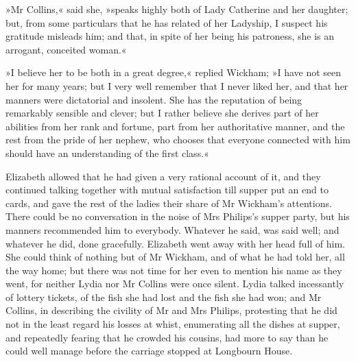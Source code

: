 »Mr Collins,« said she, »speaks highly both of Lady Catherine and her daughter; but, from some particulars that he has related of her Ladyship, I suspect his gratitude misleads him; and that, in spite of her being his patroness, she is an arrogant, conceited woman.«

»I believe her to be both in a great degree,« replied Wickham; »I have not seen her for many years; but I very well remember that I never liked her, and that her manners were dictatorial and insolent. She has the reputation of being remarkably sensible and clever; but I rather believe she derives part of her abilities from her rank and fortune, part from her authoritative manner, and the rest from the pride of her nephew, who chooses that everyone connected with him should have an understanding of the first class.«

Elizabeth allowed that he had given a very rational account of it, and they continued talking together with mutual satisfaction till supper put an end to cards, and gave the rest of the ladies their share of Mr Wickham's attentions. There could be no conversation in the noise of Mrs Philips's supper party, but his manners recommended him to everybody. Whatever he said, was said well; and whatever he did, done gracefully. Elizabeth went away with her head full of him. She could think of nothing but of Mr Wickham, and of what he had told her, all the way home; but there was not time for her even to mention his name as they went, for neither Lydia nor Mr Collins were once silent. Lydia talked incessantly of lottery tickets, of the fish she had lost and the fish she had won; and Mr Collins, in describing the civility of Mr and Mrs Philips, protesting that he did not in the least regard his losses at whist, enumerating all the dishes at supper, and repeatedly fearing that he crowded his cousins, had more to say than he could well manage before the carriage stopped at Longbourn House.